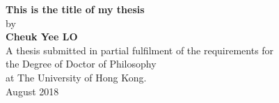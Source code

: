 {}

\begin{center}
    \large
        \hfill
        \vfill
    \begingroup
        \huge\textbf{This is the title of my thesis} \\
        \bigskip
    \endgroup
    by\\
    \bigskip
    \Large\textbf{Cheuk Yee LO}\\
    \vfill
    \vfill
    \vfill
{\normalsize
A thesis submitted in partial fulfilment of the requirements for\\
the Degree of Doctor of Philosophy\\
at The University of Hong Kong.\\
    \bigskip
August 2018}
    \vfill
\end{center}
